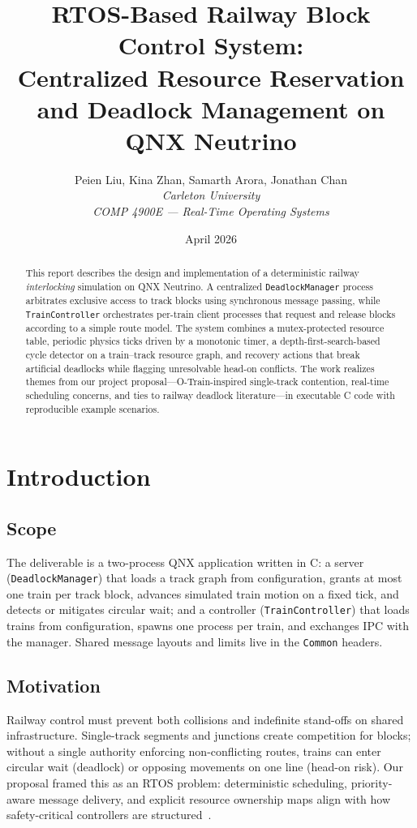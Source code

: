 \documentclass[11pt,a4paper]{article}
\title{RTOS-Based Railway Block Control System:\\
Centralized Resource Reservation and Deadlock Management on QNX Neutrino}
\author{%
Peien Liu, Kina Zhan, Samarth Arora, Jonathan Chan\\[0.5em]
\textit{Carleton University}\\
\textit{COMP 4900E --- Real-Time Operating Systems}
}
\date{April 2026}
\begin{document}
\maketitle

\begin{abstract}
This report describes the design and implementation of a deterministic railway \emph{interlocking} simulation on QNX Neutrino. A centralized \texttt{DeadlockManager} process arbitrates exclusive access to track blocks using synchronous message passing, while \texttt{TrainController} orchestrates per-train client processes that request and release blocks according to a simple route model. The system combines a mutex-protected resource table, periodic physics ticks driven by a monotonic timer, a depth-first-search-based cycle detector on a train--track resource graph, and recovery actions that break artificial deadlocks while flagging unresolvable head-on conflicts. The work realizes themes from our project proposal---O-Train-inspired single-track contention, real-time scheduling concerns, and ties to railway deadlock literature---in executable C code with reproducible example scenarios.
\end{abstract}

\tableofcontents
\newpage

\section{Introduction}

\subsection{Scope}
The deliverable is a two-process QNX application written in C: a server (\texttt{DeadlockManager}) that loads a track graph from configuration, grants at most one train per track block, advances simulated train motion on a fixed tick, and detects or mitigates circular wait; and a controller (\texttt{TrainController}) that loads trains from configuration, spawns one process per train, and exchanges IPC with the manager. Shared message layouts and limits live in the \texttt{Common} headers.

\subsection{Motivation}
Railway control must prevent both collisions and indefinite stand-offs on shared infrastructure. Single-track segments and junctions create competition for blocks; without a single authority enforcing non-conflicting routes, trains can enter circular wait (deadlock) or opposing movements on one line (head-on risk). Our proposal framed this as an RTOS problem: deterministic scheduling, priority-aware message delivery, and explicit resource ownership maps align with how safety-critical controllers are structured~\cite{dal2021tick,zhao2015review,putra2023survey}.
\end{document}
